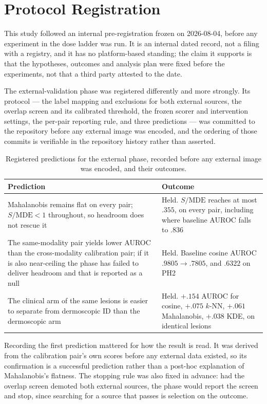 \documentclass[11pt,a4paper]{article}
\begin{document}
\section*{Protocol Registration}
This study followed an internal pre-registration frozen on 2026-08-04, before
any experiment in the dose ladder was run. It is an internal dated record, not
a filing with a registry, and it has no platform-based standing; the claim it
supports is that the hypotheses, outcomes and analysis plan were fixed before
the experiments, not that a third party attested to the date.

The external-validation phase was registered differently and more strongly. Its
protocol --- the label mapping and exclusions for both external sources, the
overlap screen and its calibrated threshold, the frozen scorer and intervention
settings, the per-pair reporting rule, and three predictions --- was committed
to the repository before any external image was encoded, and the ordering of
those commits is verifiable in the repository history rather than asserted.

\begin{table}[t]
\centering
\caption{Registered predictions for the external phase, recorded before any external image was encoded, and their outcomes.}
\label{tab:prereg}
\small
\begin{tabular}{p{5.4cm}p{7.4cm}}
\toprule
Prediction & Outcome\\
\midrule
Mahalanobis remains flat on every pair; $S/\mathrm{MDE}<1$ throughout, so headroom does not rescue it &
Held. $S/\mathrm{MDE}$ reaches at most $.355$, on every pair, including where baseline AUROC falls to $.836$\\
\addlinespace
The same-modality pair yields lower AUROC than the cross-modality calibration pair; if it is also near-ceiling the phase has failed to deliver headroom and that is reported as a null &
Held. Baseline cosine AUROC $.9805\rightarrow.7805$, and $.6322$ on PH2\\
\addlinespace
The clinical arm of the same lesions is easier to separate from dermoscopic ID than the dermoscopic arm &
Held. $+.154$ AUROC for cosine, $+.075$ $k$-NN, $+.061$ Mahalanobis, $+.038$ KDE, on identical lesions\\
\bottomrule
\end{tabular}
\end{table}

Recording the first prediction mattered for how the result is read. It was
derived from the calibration pair's own scores before any external data
existed, so its confirmation is a successful prediction rather than a
post-hoc explanation of Mahalanobis's flatness. The stopping rule was also
fixed in advance: had the overlap screen demoted both external sources, the
phase would report the screen and stop, since searching for a source that
passes is selection on the outcome.
\end{document}

